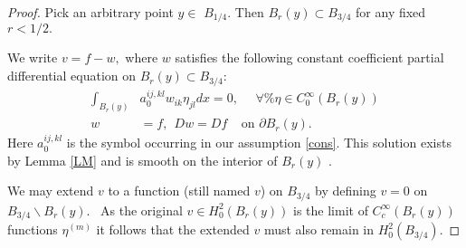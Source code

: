 \documentclass[12pt,leqno]{amsart}%
\theoremstyle{plain}
\numberwithin{equation}{section}
\theoremstyle{definition}
\begin{document}
\begin{proof}
Pick an arbitrary point $y\in$ $B_{1/4}$. Then $B_{r}(y)\subset B_{3/4}\text{
}$ for any fixed $r<1/2.$


We write $v=f-w,$ where $w$ satisfies the following constant coefficient
partial differential equation on ${B}_{r}(y)\subset B_{3/4}$:
\begin{align*}
\int_{B_{r}(y)}  &  a_{0}^{ij,kl}w_{ik}\eta_{jl}dx=0,\ \ \ \text{ $\forall$%
}\eta\in C_{0}^{\infty}(B_{r}(y))\\
w  &  =f,\ \ D w= D f\ \ \ \ \ \text{on }\partial B_{r}(y).
\end{align*}
Here $a_{0}^{ij,kl}$ is the symbol occurring in our assumption \eqref{cons}.
This solution exists by Lemma \ref{LM} and is smooth on the interior of
$B_{r}(y)$ \cite[Theorem 6.33]{Folland}.

We may extend $v$ to a function (still named $v$) on $B_{3/4}$ by defining
$v=0$ on $B_{3/4}\backslash B_{r}(y).$ \ As the original $v\in H_{0}^{2}%
(B_{r}(y))$ is the limit of $C_{c}^{\infty}(B_{r}(y))$ functions $\eta^{(m)}$
it follows that the extended $v$ must also remain in $H_{0}^{2}(B_{3/4}).$


\end{proof}
\end{document}
